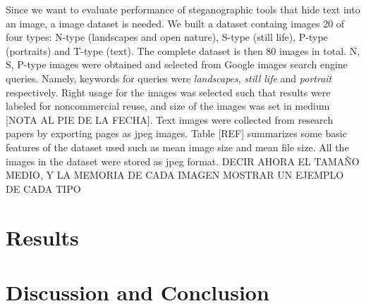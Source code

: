 \documentclass[11pt]{article}
\begin{document}
Since we want to evaluate performance of steganographic tools that hide text into an image, a image dataset is needed.
We built a dataset containg images 20 of four types: N-type (landscapes and open nature), S-type (still life), P-type (portraits) and
T-type (text). The complete dataset is then 80 images in total. N, S, P-type images were obtained and selected from Google images search engine queries.
Namely, keywords for queries were \textit{landscapes}, \textit{still life} and \textit{portrait} respectively.
Right usage for the images was selected such that results were labeled for noncommercial reuse, and size of the images was set in 
medium [NOTA AL PIE DE LA FECHA]. Text images were collected from research papers by exporting pages as jpeg images.
Table [REF] summarizes some basic features of the dataset used such as mean image size and mean file size. All the
images in the dataset were stored as jpeg format. DECIR AHORA EL TAMAÑO MEDIO, Y LA MEMORIA DE CADA IMAGEN
MOSTRAR UN EJEMPLO DE CADA TIPO


\section{Results}


\section{Discussion and Conclusion}
\end{document}
